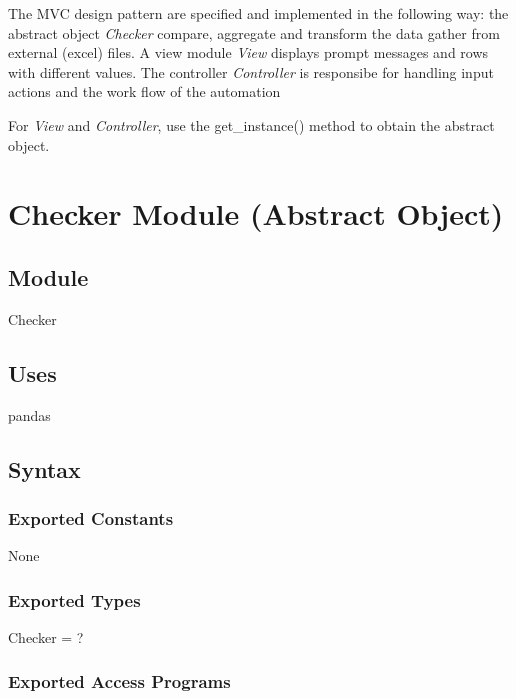 \documentclass[12pt]{article}
\begin{document}
\medskip

\noindent The MVC design pattern are specified and implemented in the following way: 
the abstract object \textit{Checker} compare, aggregate and transform the data gather 
from external (excel) files. A view module \textit{View} displays prompt messages and 
rows with different values. The controller \textit{Controller} is responsibe for handling 
input actions and the work flow of the automation

\medskip

\noindent For \textit{View} and \textit{Controller}, use the get\_instance() method to obtain the abstract object.

\newpage

\section* {Checker Module (Abstract Object)}

\subsection*{Module}

Checker

\subsection* {Uses}

pandas

\subsection* {Syntax}

\subsubsection* {Exported Constants}

None

\subsubsection* {Exported Types}

Checker = ?

\subsubsection* {Exported Access Programs}
\end{document}
